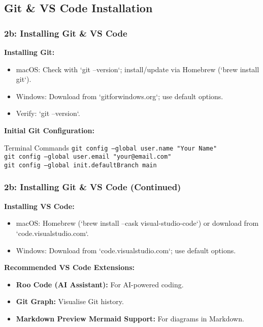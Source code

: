 \documentclass{beamer}
\begin{document}
\subsection{Git \& VS Code Installation}
\begin{frame}
  \frametitle{2b: Installing Git \& VS Code}
  \textbf{Installing Git:}
  \begin{itemize}
    \item macOS: Check with `git --version`; install/update via Homebrew (`brew install git`).
    \item Windows: Download from `gitforwindows.org`; use default options.
    \item Verify: `git --version`.
  \end{itemize}
  \pause
  \textbf{Initial Git Configuration:}
  \begin{block}{Terminal Commands}
    \texttt{git config --global user.name "Your Name"}\\
    \texttt{git config --global user.email "your@email.com"}\\
    \texttt{git config --global init.defaultBranch main}
  \end{block}
\end{frame}

\begin{frame}
  \frametitle{2b: Installing Git \& VS Code (Continued)}
  \textbf{Installing VS Code:}
  \begin{itemize}
    \item macOS: Homebrew (`brew install --cask visual-studio-code`) or download from `code.visualstudio.com`.
    \item Windows: Download from `code.visualstudio.com`; use default options.
  \end{itemize}
  \pause
  \textbf{Recommended VS Code Extensions:}
  \begin{itemize}
    \item \textbf{Roo Code (AI Assistant):} For AI-powered coding.
    \item \textbf{Git Graph:} Visualise Git history.
    \item \textbf{Markdown Preview Mermaid Support:} For diagrams in Markdown.
  \end{itemize}
\end{frame}
\end{document}
